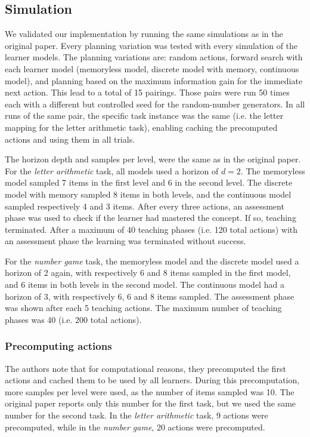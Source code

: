 \subsection{Simulation}

We validated our implementation by running the same simulations as in the original paper. 
Every planning variation was tested with every simulation of the learner models. The planning variations are: random actions, forward search with each learner model (memoryless model, discrete model with memory, continuous model), and planning based on the maximum information gain for the immediate next action. This lead to a total of 15 pairings.
Those pairs were run 50 times each with a different but controlled seed for the random-number generators. In all runs of the same pair, the specific task instance was the same (i.e. the letter mapping for the letter arithmetic task), enabling caching the precomputed actions and using them in all trials. 

The horizon depth and samples per level, were the same as in the original paper. For the \textit{letter arithmetic} task, all models used a horizon of $d=2$. The memoryless model sampled 7 items in the first level and 6 in the second level. The discrete model with memory sampled 8 items in both levels, and the continuous model sampled respectively 4 and 3 items.
After every three actions, an assessment phase was used to check if the learner had mastered the concept. If so, teaching terminated. After a maximum of 40 teaching phases (i.e. 120 total actions) with an assessment phase the learning was terminated without success.

For the \textit{number game} task, the memoryless model and the discrete model used a horizon of 2 again, with respectively 6 and 8 items sampled in the first model, and 6 items in both levels in the second model. The continuous model had a horizon of 3, with respectively 6, 6 and 8 items sampled. The assessment phase was shown after each 5 teaching actions. The maximum number of teaching phases was 40 (i.e. 200 total actions).

\subsubsection{Precomputing actions}
The authors note that for computational reasons, they precomputed the first actions and cached them to be used by all learners. During this precomputation, more samples per level were used, as the number of items sampled was 10. 
The original paper reports only this number for the first task, but we used the same number for the second task. In the \textit{letter arithmetic} task, 9 actions were precomputed, while in the \textit{number game}, 20 actions were precomputed.

